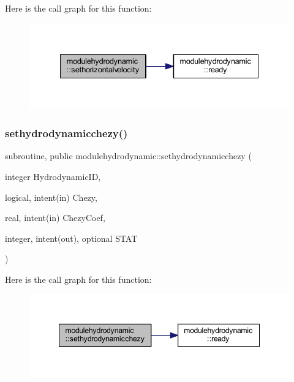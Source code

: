 Here is the call graph for this function\+:\nopagebreak
\begin{figure}[H]
\begin{center}
\leavevmode
\includegraphics[width=335pt]{namespacemodulehydrodynamic_a57dc7c696d4679f3a6d7f8f297145b63_cgraph}
\end{center}
\end{figure}
\mbox{\label{namespacemodulehydrodynamic_aa753ccba1fb48238465631f89ecd8cb6}} 
\subsubsection{\texorpdfstring{sethydrodynamicchezy()}{sethydrodynamicchezy()}}
{\footnotesize\ttfamily subroutine, public modulehydrodynamic\+::sethydrodynamicchezy (\begin{DoxyParamCaption}\item[{integer}]{Hydrodynamic\+ID,  }\item[{logical, intent(in)}]{Chezy,  }\item[{real, intent(in)}]{Chezy\+Coef,  }\item[{integer, intent(out), optional}]{S\+T\+AT }\end{DoxyParamCaption})}

Here is the call graph for this function\+:\nopagebreak
\begin{figure}[H]
\begin{center}
\leavevmode
\includegraphics[width=348pt]{namespacemodulehydrodynamic_aa753ccba1fb48238465631f89ecd8cb6_cgraph}
\end{center}
\end{figure}
\mbox{\label{namespacemodulehydrodynamic_afcbe369a4cc8b78bc18a290f3e05a412}} 
